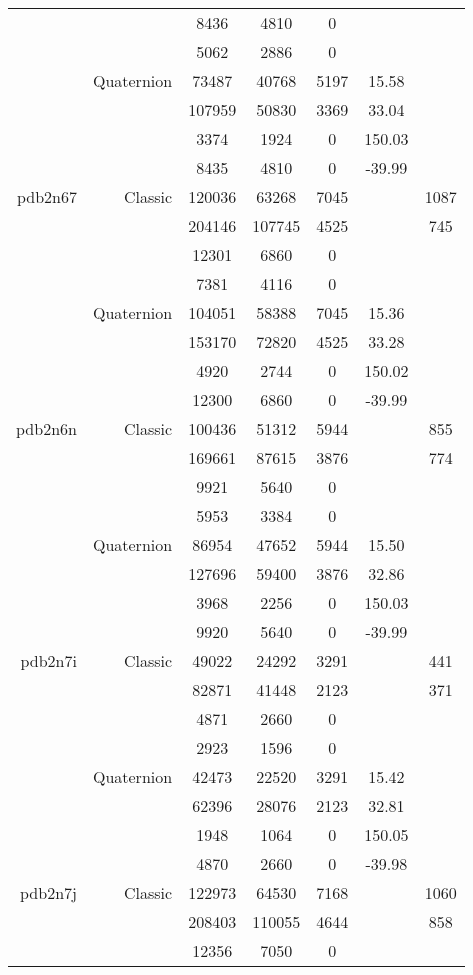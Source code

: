 \begin{xltabular}{\textwidth}{r|rcccSc}
& & 8436 & 4810 & 0 & & \\
& & 5062 & 2886 & 0 & & \\
& Quaternion & 73487 & 40768 & 5197 & 15.58 & \\
& & 107959 & 50830 & 3369 & 33.04 & \\
& & 3374 & 1924 & 0 & 150.03 & \\
& & 8435 & 4810 & 0 & -39.99 & \\ \addlinespace
pdb2n67 & Classic & 120036 & 63268 & 7045 & & 1087 \\
& & 204146 & 107745 & 4525 & & 745 \\
& & 12301 & 6860 & 0 & & \\
& & 7381 & 4116 & 0 & & \\
& Quaternion & 104051 & 58388 & 7045 & 15.36 & \\
& & 153170 & 72820 & 4525 & 33.28 & \\
& & 4920 & 2744 & 0 & 150.02 & \\
& & 12300 & 6860 & 0 & -39.99 & \\ \addlinespace
pdb2n6n & Classic & 100436 & 51312 & 5944 & & 855 \\
& & 169661 & 87615 & 3876 & & 774 \\
& & 9921 & 5640 & 0 & & \\
& & 5953 & 3384 & 0 & & \\
& Quaternion & 86954 & 47652 & 5944 & 15.50 & \\
& & 127696 & 59400 & 3876 & 32.86 & \\
& & 3968 & 2256 & 0 & 150.03 & \\
& & 9920 & 5640 & 0 & -39.99 & \\ \addlinespace
pdb2n7i & Classic & 49022 & 24292 & 3291 & & 441 \\
& & 82871 & 41448 & 2123 & & 371 \\
& & 4871 & 2660 & 0 & & \\
& & 2923 & 1596 & 0 & & \\
& Quaternion & 42473 & 22520 & 3291 & 15.42 & \\
& & 62396 & 28076 & 2123 & 32.81 & \\
& & 1948 & 1064 & 0 & 150.05 & \\
& & 4870 & 2660 & 0 & -39.98 & \\ \addlinespace
pdb2n7j & Classic & 122973 & 64530 & 7168 & & 1060 \\
& & 208403 & 110055 & 4644 & & 858 \\
& & 12356 & 7050 & 0 & & \\

\end{xltabular}
